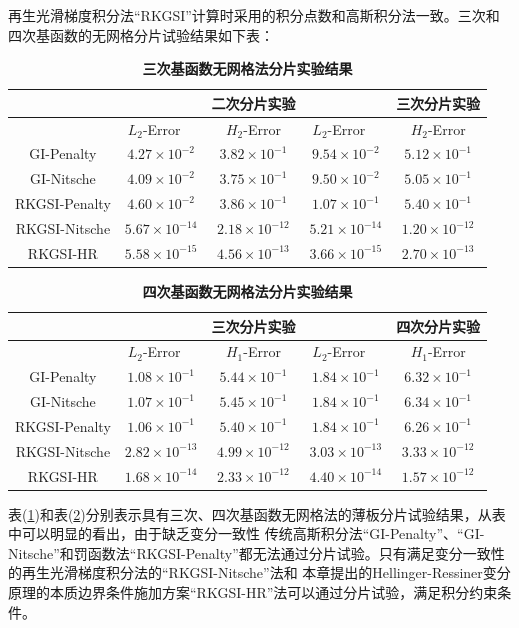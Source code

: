 再生光滑梯度积分法“RKGSI”计算时采用的积分点数和高斯积分法一致。三次和四次基函数的无网格分片试验结果如下表：
\begin{table}[H]
    \caption{\textbf{三次基函数无网格法分片实验结果}}
    \centering\label{cubic}
   \begin{tabular}{ccccc}
   \toprule
   &$\quad$ &二次分片实验 &$\quad$ &三次分片实验\\
   \midrule
   &$L_2$-Error$\quad$&$H_2$-Error&$L_2$-Error$\quad$&$H_2$-Error\\
   \midrule
   GI-Penalty&$4.27\times10^{-2}$&$3.82\times10^{-1}$&$9.54\times10^{-2}$&$5.12\times10^{-1}$\\
   GI-Nitsche&$4.09\times10^{-2}$&$3.75\times10^{-1}$&$9.50\times10^{-2}$&$5.05\times10^{-1}$\\
  RKGSI-Penalty&$4.60\times10^{-2}$&$3.86\times10^{-1}$&$1.07\times10^{-1}$&$5.40\times10^{-1}$\\
  RKGSI-Nitsche&$5.67\times10^{-14}$&$2.18\times10^{-12}$&$5.21\times10^{-14}$&$1.20\times10^{-12}$\\
  RKGSI-HR&$5.58\times10^{-15}$&$4.56\times10^{-13}$&$3.66\times10^{-15}$&$2.70\times10^{-13}$\\
   \bottomrule
   \end{tabular}
   \end{table}
\begin{table}[H]
    \caption{\textbf{四次基函数无网格法分片实验结果}}
    \centering\label{quartic}
   \begin{tabular}{ccccc}
   \toprule
   &$\quad$ &三次分片实验 &$\quad$ &四次分片实验\\
   \midrule
   &$L_2$-Error$\quad$&$H_1$-Error&$L_2$-Error$\quad$&$H_1$-Error\\
   \midrule
   GI-Penalty&$1.08\times10^{-1}$&$5.44\times10^{-1}$&$1.84\times10^{-1}$&$6.32\times10^{-1}$\\
   GI-Nitsche&$1.07\times10^{-1}$&$5.45\times10^{-1}$&$1.84\times10^{-1}$&$6.34\times10^{-1}$\\
  RKGSI-Penalty&$1.06\times10^{-1}$&$5.40\times10^{-1}$&$1.84\times10^{-1}$&$6.26\times10^{-1}$\\
  RKGSI-Nitsche&$2.82\times10^{-13}$&$4.99\times10^{-12}$&$3.03\times10^{-13}$&$3.33\times10^{-12}$\\
  RKGSI-HR&$1.68\times10^{-14}$&$2.33\times10^{-12}$&$4.40\times10^{-14}$&$1.57\times10^{-12}$\\
\bottomrule
\end{tabular}
\end{table}\par
表(\ref{cubic})和表(\ref{quartic})分别表示具有三次、四次基函数无网格法的薄板分片试验结果，从表中可以明显的看出，由于缺乏变分一致性
传统高斯积分法“GI-Penalty”、“GI-Nitsche”和罚函数法“RKGSI-Penalty”都无法通过分片试验。只有满足变分一致性的再生光滑梯度积分法的“RKGSI-Nitsche”法和
本章提出的Hellinger-Ressiner变分原理的本质边界条件施加方案“RKGSI-HR”法可以通过分片试验，满足积分约束条件。
